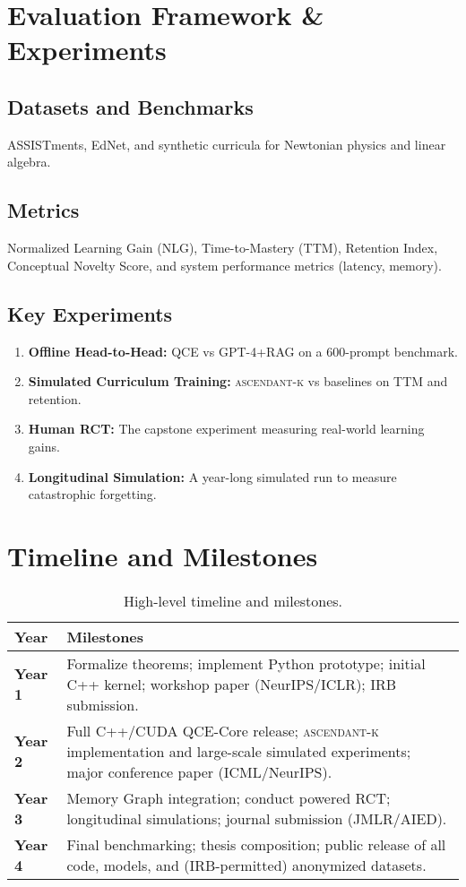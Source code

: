 \documentclass[12pt,oneside]{report}
\newcommand{\framework}[1]{\textsc{#1}}
\newcommand{\ascendantk}{\framework{ascendant-k}}
\theoremstyle{definition}
\theoremstyle{plain}
\theoremstyle{remark}
\begin{document}
\chapter{Evaluation Framework \& Experiments}
\section{Datasets and Benchmarks}
ASSISTments, EdNet, and synthetic curricula for Newtonian physics and linear algebra.

\section{Metrics}
Normalized Learning Gain (NLG), Time-to-Mastery (TTM), Retention Index, Conceptual Novelty Score, and system performance metrics (latency, memory).

\section{Key Experiments}
\begin{enumerate}[itemsep=2pt, leftmargin=*]
  \item \textbf{Offline Head-to-Head:} QCE vs GPT-4+RAG on a 600-prompt benchmark.
  \item \textbf{Simulated Curriculum Training:} \ascendantk{} vs baselines on TTM and retention.
  \item \textbf{Human RCT:} The capstone experiment measuring real-world learning gains.
  \item \textbf{Longitudinal Simulation:} A year-long simulated run to measure catastrophic forgetting.
\end{enumerate}

\chapter{Timeline and Milestones}
\begin{table}[H]
\centering
\caption{High-level timeline and milestones.}
\label{tab:timeline}
\begin{tabular}{>{\bfseries}p{2.5cm} p{10cm}}
\toprule
\textbf{Year} & \textbf{Milestones} \\
\midrule
Year 1 & Formalize theorems; implement Python prototype; initial C++ kernel; workshop paper (NeurIPS/ICLR); IRB submission. \\
Year 2 & Full C++/CUDA QCE-Core release; \ascendantk{} implementation and large-scale simulated experiments; major conference paper (ICML/NeurIPS). \\
Year 3 & Memory Graph integration; conduct powered RCT; longitudinal simulations; journal submission (JMLR/AIED). \\
Year 4 & Final benchmarking; thesis composition; public release of all code, models, and (IRB-permitted) anonymized datasets. \\
\bottomrule
\end{tabular}
\end{table}
\end{document}
